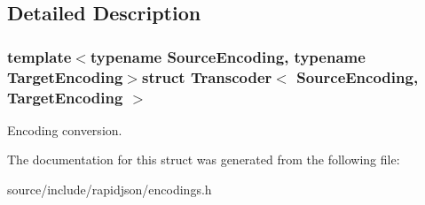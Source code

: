 \subsection{Detailed Description}
\subsubsection*{template$<$typename Source\+Encoding, typename Target\+Encoding$>$struct Transcoder$<$ Source\+Encoding, Target\+Encoding $>$}

Encoding conversion. 

The documentation for this struct was generated from the following file\+:\begin{DoxyCompactItemize}
\item 
source/include/rapidjson/encodings.\+h\end{DoxyCompactItemize}
